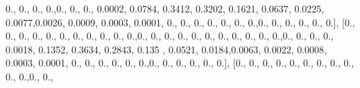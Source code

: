 \documentclass[
]{book}
\newenvironment{Shaded}{\begin{snugshade}}{\end{snugshade}}
\newcommand{\FloatTok}[1]{\textcolor[rgb]{0.00,0.00,0.81}{#1}}
\newcommand{\NormalTok}[1]{#1}
\begin{document}
\begin{Shaded}
\begin{Highlighting}[]
\FloatTok{0.}\NormalTok{, }\FloatTok{0.}\NormalTok{, }\FloatTok{0.}\NormalTok{, }\FloatTok{0.}\NormalTok{,}\FloatTok{0.}\NormalTok{, }\FloatTok{0.}\NormalTok{, }\FloatTok{0.}\NormalTok{, }\FloatTok{0.0002}\NormalTok{, }\FloatTok{0.0784}\NormalTok{, }\FloatTok{0.3412}\NormalTok{, }\FloatTok{0.3202}\NormalTok{, }\FloatTok{0.1621}\NormalTok{, }\FloatTok{0.0637}\NormalTok{,}
\FloatTok{0.0225}\NormalTok{, }\FloatTok{0.0077}\NormalTok{,}\FloatTok{0.0026}\NormalTok{, }\FloatTok{0.0009}\NormalTok{, }\FloatTok{0.0003}\NormalTok{, }\FloatTok{0.0001}\NormalTok{, }\FloatTok{0.}\NormalTok{, }\FloatTok{0.}\NormalTok{, }\FloatTok{0.}\NormalTok{, }\FloatTok{0.}\NormalTok{, }\FloatTok{0.}\NormalTok{, }\FloatTok{0.}\NormalTok{, }\FloatTok{0.}\NormalTok{,}\FloatTok{0.}\NormalTok{,}
\FloatTok{0.}\NormalTok{, }\FloatTok{0.}\NormalTok{, }\FloatTok{0.}\NormalTok{, }\FloatTok{0.}\NormalTok{, }\FloatTok{0.}\NormalTok{], [}\FloatTok{0.}\NormalTok{, }\FloatTok{0.}\NormalTok{, }\FloatTok{0.}\NormalTok{, }\FloatTok{0.}\NormalTok{, }\FloatTok{0.}\NormalTok{, }\FloatTok{0.}\NormalTok{, }\FloatTok{0.}\NormalTok{, }\FloatTok{0.}\NormalTok{, }\FloatTok{0.}\NormalTok{, }\FloatTok{0.}\NormalTok{, }\FloatTok{0.}\NormalTok{,}\FloatTok{0.}\NormalTok{, }\FloatTok{0.}\NormalTok{, }\FloatTok{0.}\NormalTok{, }\FloatTok{0.}\NormalTok{,}
\FloatTok{0.}\NormalTok{, }\FloatTok{0.}\NormalTok{, }\FloatTok{0.}\NormalTok{, }\FloatTok{0.}\NormalTok{, }\FloatTok{0.}\NormalTok{, }\FloatTok{0.}\NormalTok{, }\FloatTok{0.}\NormalTok{,}\FloatTok{0.}\NormalTok{, }\FloatTok{0.}\NormalTok{, }\FloatTok{0.}\NormalTok{, }\FloatTok{0.}\NormalTok{, }\FloatTok{0.0018}\NormalTok{, }\FloatTok{0.1352}\NormalTok{, }\FloatTok{0.3634}\NormalTok{, }\FloatTok{0.2843}\NormalTok{, }\FloatTok{0.135}
\NormalTok{, }\FloatTok{0.0521}\NormalTok{, }\FloatTok{0.0184}\NormalTok{,}\FloatTok{0.0063}\NormalTok{, }\FloatTok{0.0022}\NormalTok{, }\FloatTok{0.0008}\NormalTok{, }\FloatTok{0.0003}\NormalTok{, }\FloatTok{0.0001}\NormalTok{, }\FloatTok{0.}\NormalTok{, }\FloatTok{0.}\NormalTok{, }\FloatTok{0.}\NormalTok{, }\FloatTok{0.}\NormalTok{, }\FloatTok{0.}\NormalTok{,}
\FloatTok{0.}\NormalTok{,}\FloatTok{0.}\NormalTok{, }\FloatTok{0.}\NormalTok{, }\FloatTok{0.}\NormalTok{, }\FloatTok{0.}\NormalTok{, }\FloatTok{0.}\NormalTok{, }\FloatTok{0.}\NormalTok{], [}\FloatTok{0.}\NormalTok{, }\FloatTok{0.}\NormalTok{, }\FloatTok{0.}\NormalTok{, }\FloatTok{0.}\NormalTok{, }\FloatTok{0.}\NormalTok{, }\FloatTok{0.}\NormalTok{, }\FloatTok{0.}\NormalTok{, }\FloatTok{0.}\NormalTok{, }\FloatTok{0.}\NormalTok{, }\FloatTok{0.}\NormalTok{, }\FloatTok{0.}\NormalTok{,}\FloatTok{0.}\NormalTok{, }\FloatTok{0.}\NormalTok{,}

\end{Highlighting}
\end{Shaded}
\end{document}
